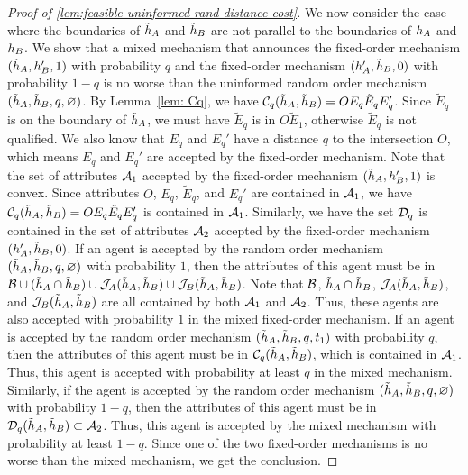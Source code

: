 \begin{proof}[Proof of \cref{lem:feasible-uninformed-rand-distance cost}]
We now consider the case where the boundaries of $\tilde{h}_A$ and $\tilde{h}_B$ are not parallel to the boundaries of $h_A$ and $h_B$.
We show that a mixed mechanism that announces the fixed-order mechanism  $(\tilde{h}_A,h_B',1)$ with probability $q$ and the fixed-order mechanism $(h_A', \tilde{h}_B, 0)$ with probability $1-q$ is no worse than the uninformed random order mechanism $(\tilde{h}_A,\tilde{h}_B,q,\varnothing)$.
By Lemma~\ref{lem: Cq}, we have $\mathcal{C}_q(\tilde {h}_A, \tilde {h}_B) = OE_q \tilde E_q E_q'$. Since $\tilde E_q$ is on the boundary of $\tilde{h}_A$, we must have $\tilde E_q$ is in $O \tilde E_1$, otherwise $\tilde E_q$ is not qualified. 
We also know that $E_q$ and $E_q'$ have a distance $q$ to the intersection $O$, which means $E_q$ and $E_q'$ are accepted by the fixed-order mechanism. 
Note that the set of attributes $\mathcal{A}_1$ accepted by the fixed-order mechanism $(\tilde{h}_A, h_B', 1)$ is convex. 
Since attributes $O$, $E_q$, $\tilde E_q$, and $E_q'$ are contained in $\mathcal{A}_1$, we have $\mathcal{C}_q(\tilde {h}_A, \tilde {h}_B) = OE_q\tilde E_qE_q'$ is contained in $\mathcal{A}_1$.
Similarly, we have the set $\mathcal{D}_q$ is contained in the set of attributes $\mathcal{A}_2$ accepted by the fixed-order mechanism $(h_A',\tilde {h}_B,0)$.
If an agent is accepted by the random order mechanism $(\tilde{h}_A, \tilde {h}_B,q,\varnothing)$ with probability $1$, then the attributes of this agent must be in $\mathcal{B} \cup (\tilde{h}_A \cap \tilde {h}_B) \cup \mathcal{J}_A(\tilde{h}_A, \tilde {h}_B) \cup \mathcal{J}_B(\tilde{h}_A, \tilde {h}_B)$. 
Note that $\mathcal{B}$, $\tilde{h}_A \cap \tilde {h}_B$, $\mathcal{J}_A(\tilde{h}_A, \tilde {h}_B)$, and $\mathcal{J}_B(\tilde{h}_A, \tilde {h}_B)$ are all contained by both $\mathcal{A}_1$ and $\mathcal{A}_2$. 
Thus, these agents are also accepted with probability $1$ in the mixed fixed-order mechanism. 
If an agent is accepted by the random order mechanism $(\tilde{h}_A, \tilde {h}_B,q,t_1)$ with probability $q$, then the attributes of this agent must be in $\mathcal{C}_q(\tilde{h}_A,\tilde{h}_B)$, which is contained in $\mathcal{A}_1$.
Thus, this agent is accepted with probability at least $q$ in the mixed mechanism.
Similarly, if the agent is accepted by the random order mechanism $(\tilde{h}_A, \tilde {h}_B,q,\varnothing)$ with probability $1-q$, then the attributes of this agent must be in $\mathcal{D}_q(\tilde{h}_A,\tilde{h}_B)\subset \mathcal{A}_2$.
Thus, this agent is accepted by the mixed mechanism with probability at least $1-q$.
Since one of the two fixed-order mechanisms is no worse than the mixed mechanism, we get the conclusion.
\end{proof}


